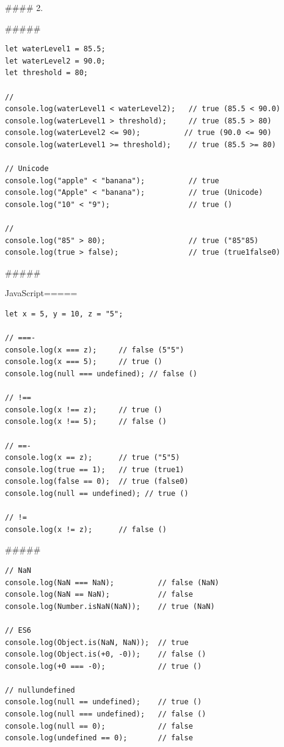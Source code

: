 {#### 2. 

##### 

\begin{lstlisting}[style=javascript]
let waterLevel1 = 85.5;
let waterLevel2 = 90.0;
let threshold = 80;

// 
console.log(waterLevel1 < waterLevel2);   // true (85.5 < 90.0)
console.log(waterLevel1 > threshold);     // true (85.5 > 80)
console.log(waterLevel2 <= 90);          // true (90.0 <= 90)
console.log(waterLevel1 >= threshold);    // true (85.5 >= 80)

// Unicode
console.log("apple" < "banana");          // true
console.log("Apple" < "banana");          // true (Unicode)
console.log("10" < "9");                  // true ()

// 
console.log("85" > 80);                   // true ("85"85)
console.log(true > false);                // true (true1false0)
\end{lstlisting}

##### 

JavaScript=====

\begin{lstlisting}[style=javascript]
let x = 5, y = 10, z = "5";

// ===- 
console.log(x === z);     // false (5"5")
console.log(x === 5);     // true ()
console.log(null === undefined); // false ()

// !==
console.log(x !== z);     // true ()
console.log(x !== 5);     // false ()

// ==- 
console.log(x == z);      // true ("5"5)
console.log(true == 1);   // true (true1)
console.log(false == 0);  // true (false0)
console.log(null == undefined); // true ()

// !=
console.log(x != z);      // false ()
\end{lstlisting}

##### 

\begin{lstlisting}[style=javascript]
// NaN
console.log(NaN === NaN);          // false (NaN)
console.log(NaN == NaN);           // false
console.log(Number.isNaN(NaN));    // true (NaN)

// ES6
console.log(Object.is(NaN, NaN));  // true
console.log(Object.is(+0, -0));    // false ()
console.log(+0 === -0);            // true ()

// nullundefined
console.log(null == undefined);    // true ()
console.log(null === undefined);   // false ()
console.log(null == 0);            // false
console.log(undefined == 0);       // false
\end{lstlisting}

}
